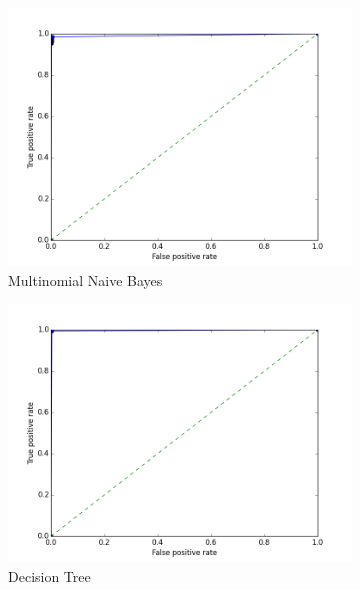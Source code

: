 \documentclass{article} %
\begin{document}
\begin{figure}[h]
  \centering
  \begin{subfigure}{0.3\textwidth}
    \includegraphics[width=\textwidth]{naive_bayes_roc_curve.png}
    \caption{Multinomial Naive Bayes}
  \end{subfigure}
  \begin{subfigure}{0.3\textwidth}
    \includegraphics[width=\textwidth]{decision_tree_roc_curve.png}
    \caption{Decision Tree}
  \end{subfigure}
  \begin{subfigure}{0.3\textwidth}

\end{subfigure}
\end{figure}
\end{document}
